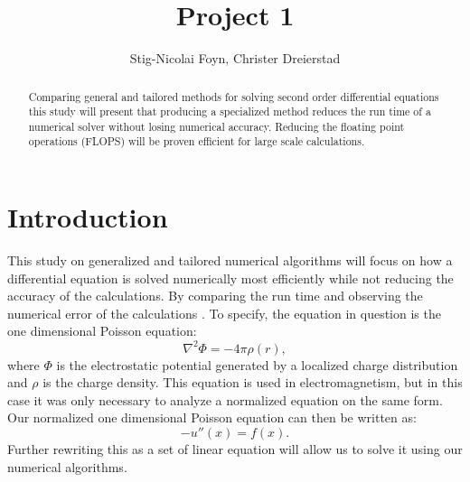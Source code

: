 \documentclass{emulateapj}
\begin{document}
\title{Project 1}

\author{Stig-Nicolai Foyn, Christer Dreierstad}





\begin{abstract}
Comparing general and tailored methods for solving second order differential equations this study will present that producing a specialized method reduces the run time of a numerical solver without losing numerical accuracy. Reducing the floating point operations (FLOPS) will be proven efficient for large scale calculations.

\end{abstract}

\section{Introduction}
\label{sec:introduction}
This study on generalized and tailored numerical algorithms will focus on how a differential equation is solved numerically most efficiently while not reducing the accuracy of the calculations. By comparing the run time and observing the numerical error of the calculations . To specify, the equation in question is the one dimensional Poisson equation:
%
\begin{equation}
    {\nabla^{2}} \Phi = -4\pi \rho(r),
\end{equation}
%
where $\Phi$ is the electrostatic potential generated by a localized charge distribution and $\rho$ is the charge density. This equation is used in electromagnetism, but in this case it was only necessary to analyze a normalized equation on the same form. Our normalized one dimensional Poisson equation can then be written as:
%
\begin{equation}\label{eq:-u''}
    -u''(x) = f(x).
\end{equation}
%
Further rewriting this as a set of linear equation will allow us to solve it using our numerical algorithms.

\end{document}
